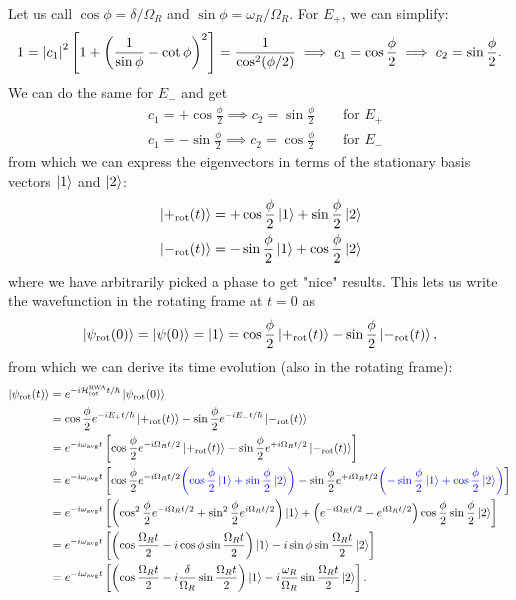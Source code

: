 \documentclass{article}
\theoremstyle{definition}
\newcommand{\ham}{\mathcal{H}}
\newcommand{\f}[2]{\frac{#1}{#2}}
\newcommand{\lp}{\left(}
\newcommand{\rp}{\right)}
\newcommand{\lb}{\left[}
\newcommand{\rb}{\right]}
\newcommand{\psirot}{\ket{\psi_\text{rot}(t)} }
\newcommand{\RWA}{\ham_\text{rot}^\text{RWA}}
\begin{document}
\begin{enumerate}[label=\alph*)]
\begin{align*}
	\end{align*}
	Let us call $\cos\phi = \delta/\Omega_R$ and $\sin\phi = \omega_R / \Omega_R$. For $E_+$, we can simplify:
	\begin{align*}
	1 = \abs{c_1}^2 \lb 1+ \lp \f{1}{\sin\phi} - \cot\phi \rp^2 \rb = \f{1}{\cos^2(\phi/2)} \implies c_1 = \cos\f{\phi}{2} \implies c_2 = \sin\f{\phi}{2}.
	\end{align*}
	We can do the same for $E_-$ and get
	\begin{align*}
	&c_1 = +\cos\f{\phi}{2} \implies c_2 = \sin\f{\phi}{2} \quad\quad\text{for } E_+\\
	&c_1 = -\sin\f{\phi}{2} \implies c_2 = \cos\f{\phi}{2} \quad\quad\text{for } E_-
	\end{align*}
	from which we can express the eigenvectors in terms of the stationary basis vectors $\ket{1}$ and $\ket{2}$:
	\begin{align*}
	&\ket{+_\text{rot}(t)} = +\cos \f{\phi}{2} \ket{1} + \sin\f{\phi}{2}\ket{2} \\
	&\ket{-_\text{rot}(t)} = -\sin \f{\phi}{2} \ket{1} + \cos\f{\phi}{2}\ket{2}
	\end{align*}
	where we have arbitrarily picked a phase to get "nice" results. This lets us write the wavefunction in the rotating frame at $t=0$ as 
	\begin{align*}
	\ket{\psi_\text{rot}(0)} = \ket{\psi(0)} = \ket{1} = \cos\f{\phi}{2}\ket{+_\text{rot}(t)} -\sin\f{\phi}{2}\ket{-_\text{rot}(t)},
	\end{align*}
	from which we can derive its time evolution (also in the rotating frame):
	\begin{align*}
	\psirot 
	&= e^{-i \RWA t/\hbar} \ket{\psi_\text{rot}(0)} \\
	&= \cos\f{\phi}{2}e^{-i E_+ t/\hbar} \ket{+_\text{rot}(t)} -\sin\f{\phi}{2}e^{-i E_- t/\hbar}\ket{-_\text{rot}(t)}\\
	&= e^{-i\omega_\text{avg} t}\lb \cos\f{\phi}{2} e^{-i\Omega_R t/2} \ket{+_\text{rot}(t)} - \sin\f{\phi}{2}e^{+i\Omega_R t/2} \ket{-_\text{rot}(t)} \rb\\
	&= e^{-i\omega_\text{avg} t}\lb \cos\f{\phi}{2} e^{-i\Omega_R t/2} \textcolor{blue}{\lp \cos \f{\phi}{2} \ket{1} + \sin\f{\phi}{2}\ket{2} \rp}- \sin\f{\phi}{2}e^{+i\Omega_R t/2} \textcolor{blue}{\lp -\sin \f{\phi}{2} \ket{1} + \cos\f{\phi}{2}\ket{2}  \rp } \rb \\
	&= e^{-i\omega_\text{avg} t}\lb \lp \cos^2\f{\phi}{2} e^{-i\Omega_R t/2}+\sin^2\f{\phi}{2} e^{i\Omega_R t/2}  \rp \ket{1} + \lp e^{-i\Omega_R t/2} - e^{i\Omega_R t/2}  \rp \cos\f{\phi}{2}\sin\f{\phi}{2}\ket{2} \rb \\
	&= e^{-i\omega_\text{avg} t}\lb \lp \cos\f{\Omega_R t}{2} - i\cos \phi \sin\f{\Omega_R t}{2} \rp \ket{1} - i\sin\phi \sin\f{\Omega_R t}{2} \ket{2} \rb \\
	&= e^{-i\omega_\text{avg}t }\lb \lp \cos\f{\Omega_R t}{2} - i\f{\delta}{\Omega_R} \sin\f{\Omega_R t}{2}   \rp \ket{1} - i\f{\omega_R}{\Omega_R} \sin\f{\Omega_R t}{2} \ket{2}\rb.
 	\end{align*}
	

\end{enumerate}
\end{document}
